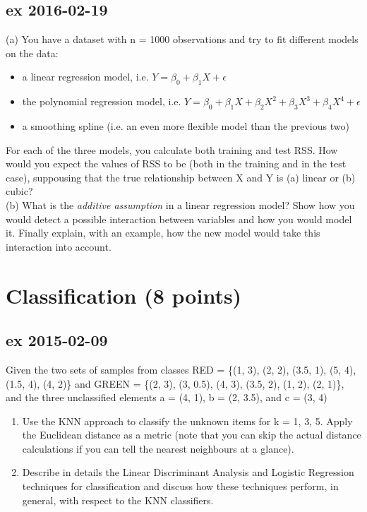 \documentclass[a4paper,12pt,titlepage]{article} %
\begin{document}
\subsection{ex 2016-02-19}
(a) You have a dataset with n = 1000 observations and try to fit different models on the data:
\begin{itemize}
\item a linear regression model, i.e. $ Y = \beta_{0} + \beta_{1} X + \epsilon $
\item the polynomial regression model, i.e. $ Y = \beta_{0} + \beta_{1} X + \beta_{2} X^{2} + \beta_{3} X^{3} + \beta_{4} X^{4} + \epsilon $
\item a smoothing spline (i.e. an even more flexible model than the previous two)
\end{itemize}

For each of the three models, you calculate both training and test RSS. How would you expect the values of RSS to be (both in the training and in the test case), suppousing that the true relationship between X and Y is (a) linear or (b) cubic?\\

(b) What is the \textit{additive assumption} in a linear regression model? Show how you would detect a possible interaction between variables and how you would model it. Finally explain, with an example, how the new model would take this interaction into account.

\newpage
\section{Classification (8 points)}
\subsection{ex 2015-02-09}
Given the two sets of samples from classes RED = \{(1, 3), (2, 2), (3.5, 1), (5, 4), (1.5, 4), (4, 2)\} and GREEN = \{(2, 3), (3, 0.5), (4, 3), (3.5, 2), (1, 2), (2, 1)\}, and the three unclassified elements a = (4, 1), b = (2, 3.5), and c = (3, 4)
\begin{enumerate}
\item Use the KNN approach to classify the unknown items for k = 1, 3, 5. Apply the Euclidean distance as a metric (note that you can skip the actual distance calculations if you can tell the nearest neighbours at a glance).
\item Describe in details the Linear Discriminant Analysis and Logistic Regression techniques for classification and discuss how these techniques perform, in general, with respect to the KNN classifiers.
\end{enumerate}
\end{document}
